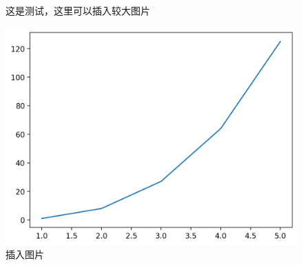 \documentclass{cumcmthesis} %
\begin{document}
\begin{figure}[H]
    \centering
    \caption{这是测试，这里可以插入较大图片}
\end{figure}

\begin{figure}[H]
    \centering
    \includegraphics[width= 1\textwidth]{img/1.png}
    \caption{插入图片}
\end{figure}
\end{document}
